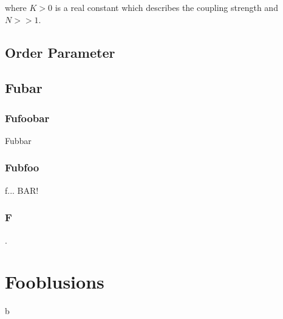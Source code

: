 \noindent where $K>0$ is a real constant which describes the coupling strength and  $N>>1$.

\section{Order Parameter}

\section{Fubar}

\subsection{Fufoobar}

Fubbar

\subsection{Fubfoo}

f... BAR!

\subsection{F}

.

\chapter{Fooblusions}

b

